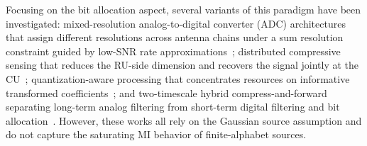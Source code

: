 \documentclass[10pt, twocolumn, comsoc]{IEEEtran}
\begin{document}


Focusing on the bit allocation aspect, several variants of this paradigm have been investigated: mixed-resolution analog-to-digital converter (ADC) architectures that assign different resolutions across antenna chains under a sum resolution constraint guided by low-SNR rate approximations~\cite{park2017mixed}; distributed compressive sensing that reduces the RU-side dimension and recovers the signal jointly at the CU~\cite{rao2015distributed}; quantization-aware processing that concentrates resources on informative transformed coefficients~\cite{zhang2021quantization}; and two-timescale hybrid compress-and-forward separating long-term analog filtering from short-term digital filtering and bit allocation~\cite{liu2019twotimescale}. However, these works all rely on the Gaussian source assumption and do not capture the saturating MI behavior of finite-alphabet sources.

\end{document}

